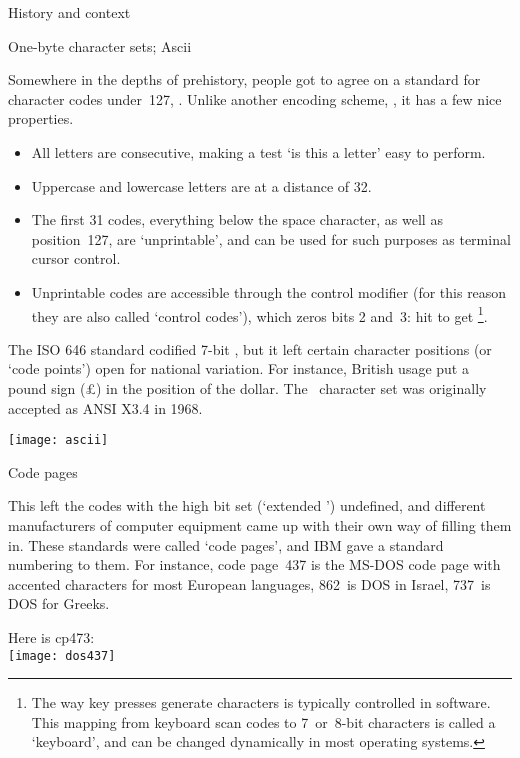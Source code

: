 {History and context}

 {One-byte character sets; Ascii}

Somewhere in the depths of prehistory, people got to agree on a
standard for character codes under~127,
\ascii. Unlike another encoding scheme,
\ebcdic, it has a few nice properties.
\begin{itemize}
\item All letters are consecutive, making a test `is this a letter'
  easy to perform.
\item Uppercase and lowercase letters are at a distance of 32.
\item The first 31 codes, everything below the space character, as
  well as position~127, are
  `unprintable', and can be used for such
  purposes as terminal cursor control.
\item Unprintable codes are accessible through the control modifier
  (for this reason they are also called `control codes'), which zeros bits 2 and~3: hit \n{Ctrl-[} to
  get \footnote{The way key presses generate characters is
    typically controlled in software. This mapping from keyboard
    scan codes to 7~or~8-bit characters is called a
    `keyboard', and can be changed dynamically in most operating systems.}. 
\end{itemize}

The ISO 646 standard codified 7-bit \ascii,
but it left certain character positions (or `code
points') open for national variation. For instance, British usage put
a pound sign (\pounds) in the position of the dollar. The
\ascii\ character set was originally accepted as ANSI X3.4 in 1968.

\texttt{[image: ascii]}

 {Code pages}

This left the codes with the high bit set
(`extended \ascii') undefined, and different
manufacturers of computer equipment came up with their own way of
filling them in. These standards were called `code
pages', and IBM gave a standard numbering to them. For instance, code
page~437 is the MS-DOS code page with accented characters for most
European languages, 862~is DOS in Israel, 737~is DOS for Greeks. 

Here is cp473:\\
\texttt{[image: dos437]}

